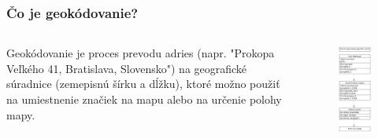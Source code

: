 \documentclass{beamer}
\begin{document}
\begin{frame}[fragile=singleslide]\frametitle{Čo je geokódovanie?}
\begin{columns}
	\begin{column}{0.5\textwidth}
	Geokódovanie je proces prevodu adries (napr. "Prokopa Veľkého 41, Bratislava, Slovensko") na geografické súradnice (zemepisnú šírku a dĺžku), ktoré možno použiť na umiestnenie značiek na mapu alebo na určenie polohy mapy.
	\end{column}
		
	\begin{column}{0.5\textwidth}
	\begin{figure}[h]
		\centering
		\includegraphics[scale=0.27]{diagram1.pdf}

\end{figure}
\end{column}
\end{columns}
\end{frame}
\end{document}
